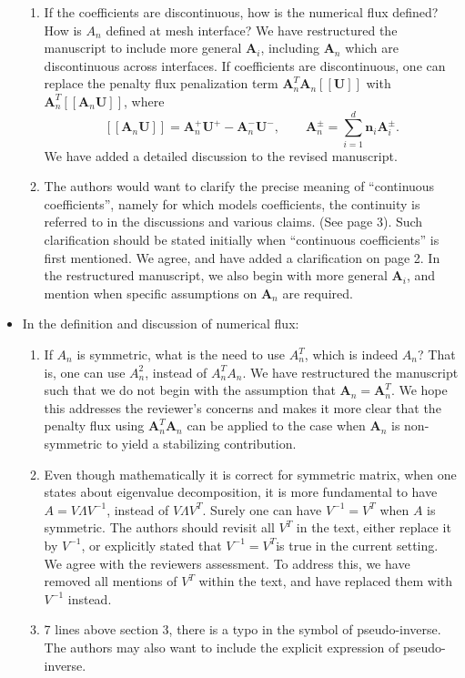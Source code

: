 \documentclass[10pt]{article}
\newcommand{\LRs}[1]{\left[ #1 \right]}
\newcommand{\jump}[1] {\ensuremath{\LRs{\![#1]\!}}}
\newcommand{\note}[1]{{\color{blue}#1}}
\begin{document}
\begin{itemize}
\begin{enumerate}
\item If the coefficients are discontinuous, how is the numerical flux defined? How is $A_n$ defined at mesh interface? 
\note{We have restructured the manuscript to include more general $\bm{A}_i$, including $\bm{A}_n$ which are discontinuous across interfaces.  If coefficients are discontinuous, one can replace the penalty flux penalization term $\bm{A}_n^T\bm{A}_n\jump{\bm{U}}$ with $\bm{A}_n^T\jump{\bm{A}_n\bm{U}}$, where
\[
\jump{\bm{A}_n\bm{U}} = \bm{A}_n^+\bm{U}^+ - \bm{A}_n^-\bm{U}^-, \qquad \bm{A}_n^{\pm} = \sum_{i=1}^d \bm{n}_i \bm{A}_i^{\pm}.
\]
We have added a detailed discussion to the revised manuscript.  }
\item The authors would want to clarify the precise meaning of ``continuous coefficients'', namely for which models coefficients, the continuity is referred to in the discussions and various claims. (See page 3). Such clarification should be stated initially when ``continuous coefficients'' is first mentioned.  
\note{We agree, and have added a clarification on page 2.  In the restructured manuscript, we also begin with more general $\bm{A}_i$, and mention when specific assumptions on $\bm{A}_n$ are required.  }
\end{enumerate}
\item In the definition and discussion of numerical flux: 
\begin{enumerate}
\item If $A_n$ is symmetric, what is the need to use $A_n^T$, which is indeed $A_n$? That is, one can use $A_n^2$, instead of $A_n^TA_n$.  
\note{We have restructured the manuscript such that we do not begin with the assumption that $\bm{A}_n = \bm{A}_n^T$.  We hope this addresses the reviewer's concerns and makes it more clear that the penalty flux using $\bm{A}_n^T\bm{A}_n$ can be applied to the case when $\bm{A}_n$ is non-symmetric to yield a stabilizing contribution. }
\item Even though mathematically it is correct for symmetric matrix, when one states about eigenvalue decomposition, it is more fundamental to have $A = V\Lambda V^{-1}$, instead of $V \Lambda V^{T}$. Surely one can have $V^{-1}=V^{T}$ when $A$ is symmetric. The authors should revisit all $V^{T}$ in the text, either replace it by $V^{-1}$, or explicitly stated that $V^{-1}=V^{T} $is true in the current setting.  
\note{We agree with the reviewers assessment.  To address this, we have removed all mentions of $V^T$ within the text, and have replaced them with $V^{-1}$ instead.}
\item 7 lines above section 3, there is a typo in the symbol of pseudo-inverse. The authors may also want to include the explicit expression of pseudo-inverse.

\end{enumerate}
\end{itemize}
\end{document}
